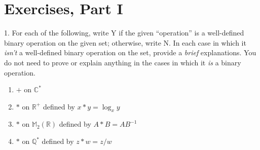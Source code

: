 \documentclass[10pt,]{book}
\theoremstyle{plain}
\theoremstyle{definition}
\theoremstyle{definition}
\theoremstyle{definition}
\theoremstyle{definition}
\numberwithin{equation}{section}
\def\R{\mathbb{R}}
\def\Q{\mathbb{Q}}
\def\C{\mathbb{C}}
\def\M{\mathbb{M}}
\begin{document}
\section[{Exercises, Part I}]{Exercises, Part I}\label{exercises-2}
\begin{exerciselist}
\item[1.]\hypertarget{exercise-7}{}
        For each of the following, write Y if the given ``operation'' is a well-defined binary operation on the given set; otherwise, write N. In each case in which it \emph{isn't} a well-defined binary operation on the set, provide a \emph{brief} explanations. You do not need to prove or explain anything in the cases in which it \emph{is} a binary operation.
        \leavevmode%
\begin{enumerate}[label=(\alph*)]
\item\hypertarget{li-58}{}
              \(+\) on \(\C^*\)
\item\hypertarget{li-59}{}
              \(*\) on \(\R^+\) defined by \(x*y=\log_x y\)
\item\hypertarget{li-60}{}
              \(*\) on \(\M_2(\R)\) defined by \(A*B=AB^{-1}\)
\item\hypertarget{li-61}{}
              \(*\) on \(\Q^*\) defined by \(z*w=z/w\)
\end{enumerate}


\end{exerciselist}
\end{document}

